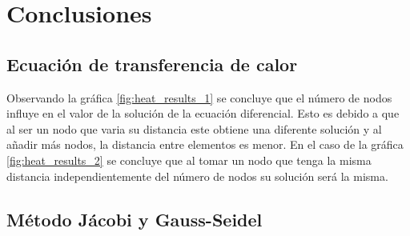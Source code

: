 \section{Conclusiones}

\subsection{Ecuación de transferencia de calor}

Observando la gráfica \ref{fig:heat_results_1} se concluye que el número de nodos influye en el valor de la solución de la ecuación diferencial. Esto es debido a que al ser un nodo que varia su distancia este obtiene una diferente solución y al añadir más nodos, la distancia entre elementos es menor. En el caso de la gráfica \ref{fig:heat_results_2} se concluye que al tomar un nodo que tenga la misma distancia independientemente del número de nodos su solución será la misma.

\subsection{Método Jácobi y Gauss-Seidel}
